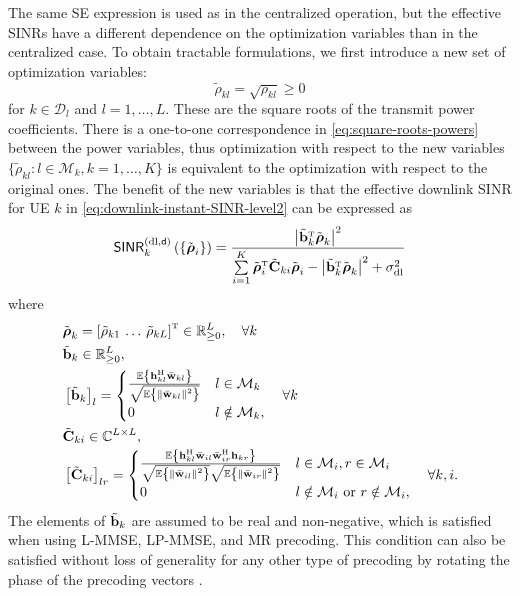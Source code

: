 The same SE expression is used as in the centralized operation, but the effective SINRs have a different dependence on the optimization variables than in the centralized case.
To obtain tractable formulations, we first introduce a new set of optimization variables:
\begin{equation} \label{eq:square-roots-powers}
\tilde{\rho}_{kl}=\sqrt{\rho_{kl}}\geq0
\end{equation}
for $k\in \mathcal{D}_l$ and $l=1,\ldots,L$.
These are the square roots of the transmit power coefficients. There is a one-to-one correspondence in \eqref{eq:square-roots-powers} between the power variables, thus optimization with respect to the new variables $\{\tilde{\rho}_{kl} :  l\in \mathcal{M}_k, k=1,\ldots,K\}$ is equivalent to the optimization with respect to the original ones. The benefit of the new variables is that 
the effective downlink SINR for UE $k$ in \eqref{eq:downlink-instant-SINR-level2} can be expressed as
\begin{align}\label{eq:SINR-downlink-2}
\mathacr{SINR}_{k}^{({\rm dl},\dist)}\left(\left\{\tilde{\boldsymbol{\rho}}_i\right\}\right)=\frac{\left|\tilde{\vect{b}}_k^{\Ttran}\tilde{\boldsymbol{\rho}}_k\right|^2}{\sum\limits_{i=1}^K\tilde{\boldsymbol{\rho}}_i^{\Ttran}\tilde{\vect{C}}_{ki}\tilde{\boldsymbol{\rho}}_i-\left|\tilde{\vect{b}}_k^{\Ttran}\tilde{\boldsymbol{\rho}}_k\right|^2+\sigmaDL}
\end{align}
where
\begin{align}
 &\tilde{\boldsymbol{\rho}}_k=\left [ \tilde{\rho}_{k1} \, \ldots \, \tilde{\rho}_{kL} \right ]^{\Ttran} \in \mathbb{R}_{\geq 0}^L, \quad \forall k \\
  &\tilde{\vect{b}}_k \in \mathbb{R}_{\geq 0}^L, \nonumber \\
   & \left[ \tilde{\vect{b}}_{k} \right]_{l}=\begin{cases}  \frac{\mathbb{E} \left\{ \vect{h}_{kl}^{\Htran}\bar{\vect{w}}_{kl}\right\}}{\sqrt{\mathbb{E}\left\{\left\| \bar{\vect{w}}_{kl}\right\|^2\right\}}} &  l\in \mathcal{M}_k \\
  0 & l \notin \mathcal{M}_k, \end{cases} \quad \forall k \\
  & \tilde{\vect{C}}_{ki}\in \mathbb{C}^{L \times L}, \nonumber \\
  &\left[ \tilde{\vect{C}}_{ki} \right]_{lr}=\begin{cases}\frac{\mathbb{E} \left\{ \vect{h}_{kl}^{\Htran}\bar{\vect{w}}_{il}\bar{\vect{w}}_{ir}^{\Htran}\vect{h}_{kr}\right\}}{\sqrt{\mathbb{E}\left\{\left\| \bar{\vect{w}}_{il}\right\|^2\right\}}\sqrt{\mathbb{E}\left\{\left\| \bar{\vect{w}}_{ir}\right\|^2\right\}}} &  l\in \mathcal{M}_i, r\in \mathcal{M}_i \\ 0 & l\notin \mathcal{M}_i \textrm{ or } r\notin \mathcal{M}_i, \end{cases} \quad \forall k,i .
\end{align}
The elements of $\tilde{\mathbf{b}}_k$ are assumed to be real and non-negative, which is satisfied when using L-MMSE, LP-MMSE, and MR precoding. This condition can also be satisfied without loss of generality for any other type of precoding by rotating the phase of the precoding vectors \cite{Bengtsson2001a}. 

